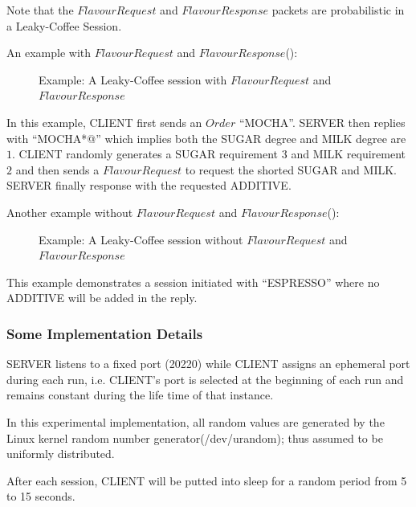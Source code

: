 Note that the $FlavourRequest$ and $FlavourResponse$ packets are probabilistic in a Leaky-Coffee Session.

\begin{example}
An example with $FlavourRequest$ and $FlavourResponse$():

{
\begin{figure}[H]
\centering
\resizebox{7cm}{!}
{}
\caption{Example: A Leaky-Coffee session with $FlavourRequest$ and $FlavourResponse$}
\label{Fig: Leaky-Coffee Example1}
\end{figure}
}
In this example, CLIENT first sends an $Order$ “MOCHA”. SERVER then replies with “MOCHA*@” which implies both the SUGAR degree and MILK degree are $1$. CLIENT randomly generates a SUGAR requirement $3$ and MILK requirement $2$ and then sends a $FlavourRequest$ to request the shorted SUGAR and MILK. SERVER finally response with the requested ADDITIVE.
\end{example}

\begin{example}
Another example without $FlavourRequest$ and $FlavourResponse$():

\begin{figure}[H]
\centering
\resizebox{6cm}{!}
{}
\caption{Example: A Leaky-Coffee session without $FlavourRequest$ and $FlavourResponse$}
\label{Fig: Leaky-Coffee Example2}
\end{figure}

This example demonstrates a session initiated with “ESPRESSO” where no ADDITIVE will be added in the reply.
\end{example}

\subsubsection{Some Implementation Details}
SERVER listens to a fixed port (20220) while CLIENT assigns an ephemeral port during each run, i.e. CLIENT’s port is selected at the beginning of each run and remains constant during the life time of that instance.

In this experimental implementation, all random values are generated by the Linux kernel random number generator(/dev/urandom); thus assumed to be uniformly distributed. 

After each session, CLIENT will be putted into sleep for a random period from 5 to 15 seconds.

